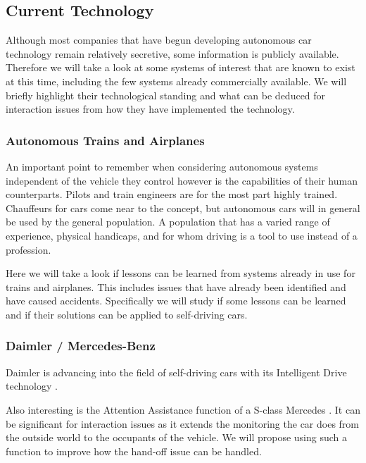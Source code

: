 \documentclass{acm_proc_article-sp}
\begin{document}
\subsection{Current Technology}
\label{current_tech}

Although most companies that have begun developing autonomous car technology remain relatively secretive, some information is publicly available.
Therefore we will take a look at some systems of interest that are known to exist at this time, including the few systems already commercially available.
We will briefly highlight their technological standing and what can be deduced for interaction issues from how they have implemented the technology.

\subsubsection{Autonomous Trains and Airplanes}

An important point to remember when considering autonomous systems independent of the vehicle they control however is the capabilities of their human counterparts.
Pilots and train engineers are for the most part highly trained.
Chauffeurs for cars come near to the concept, but autonomous cars will in general be used by the general population.
A population that has a varied range of experience, physical handicaps, and for whom driving is a tool to use instead of a profession.

Here we will take a look if lessons can be learned from systems already in use for trains and airplanes.
This includes issues that have already been identified and have caused accidents.
Specifically we will study if some lessons can be learned and if their solutions can be applied to self-driving cars.

\subsubsection{Daimler / Mercedes-Benz}

Daimler is advancing into the field of self-driving cars with its Intelligent Drive technology \cite{www:daimler_intelligent_drive}.

Also interesting is the Attention Assistance function of a S-class Mercedes \cite{www:mercedes_attention_assist}.
It can be significant for interaction issues as it extends the monitoring the car does from the outside world to the occupants of the vehicle.
We will propose using such a function to improve how the hand-off issue can be handled.
\end{document}
